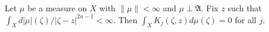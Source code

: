 
Let $\mu$ be a measure on $X$ with $\|\mu\| < \infty$ and $\mu \perp \mathfrak{A}$. Fix $z$ such that $\int_X d|\mu|(\zeta)/|\zeta - z|^{2n-1} < \infty$. Then $\int_X K_j(\zeta, z) d\mu(\zeta) = 0$ for all $j$.
